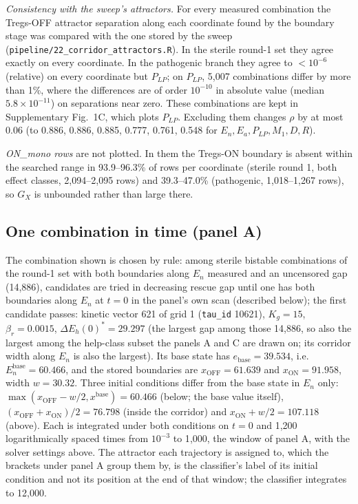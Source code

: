 \documentclass[11pt]{article}
\newcommand{\gap}{\Delta E_h(0)^{*}}
\begin{document}
\emph{Consistency with the sweep's attractors.} For every measured combination the Tregs-OFF
attractor separation along each coordinate found by the boundary stage was compared with the
one stored by the sweep (\texttt{pipeline/22\_corridor\_attractors.R}). In the sterile round-1 set
they agree exactly on every coordinate. In the pathogenic branch they agree to $<10^{-6}$
(relative) on every coordinate but $P_{LP}$; on $P_{LP}$, 5{,}007 combinations differ by more than
1\%, where the differences are of order $10^{-10}$ in absolute value (median
$5.8\times10^{-11}$) on separations near zero. These combinations are kept in Supplementary Fig.~1C, which
plots $P_{LP}$. Excluding them changes $\rho$ by at most 0.06 (to 0.886, 0.886, 0.885, 0.777,
0.761, 0.548 for $E_n, E_a, P_{LP}, M_1, D, R$).

\emph{ON\_mono rows} are not plotted. In them the Tregs-ON boundary is absent within the searched
range in 93.9--96.3\% of rows per coordinate (sterile round 1, both effect classes,
2{,}094--2{,}095 rows) and
39.3--47.0\% (pathogenic, 1{,}018--1{,}267 rows), so $G_X$ is unbounded rather than large there.

\subsection{One combination in time (panel A)}

The combination shown is chosen by rule: among sterile bistable combinations of the round-1 set
with both boundaries along $E_n$ measured and an uncensored gap (14{,}886), candidates are tried
in decreasing rescue gap until one has both boundaries along $E_n$ at $t=0$ in the panel's own
scan (described below); the first candidate passes: kinetic vector 621 of grid 1
(\texttt{tau\_id} 10621), $K_g = 15$, $\beta_r = 0.0015$, $\gap = 29.297$
(the largest gap among those 14{,}886, so also the largest among the help-class subset the
panels A and C are drawn on; its corridor width along $E_n$ is also the largest).
Its base state has $e_{\mathrm{base}} = 39.534$, i.e.\ $E_n^{\mathrm{base}} = 60.466$, and the stored
boundaries are $x_{\mathrm{OFF}} = 61.639$ and $x_{\mathrm{ON}} = 91.958$, width $w = 30.32$. Three initial
conditions differ from the base state in $E_n$ only:
$\max(x_{\mathrm{OFF}} - w/2, x^{\mathrm{base}}) = 60.466$ (below; the base value itself),
$(x_{\mathrm{OFF}}+x_{\mathrm{ON}})/2 = 76.798$ (inside the corridor) and $x_{\mathrm{ON}} + w/2 = 107.118$ (above).
Each is integrated under both conditions on $t=0$ and 1{,}200 logarithmically spaced times from
$10^{-3}$ to 1{,}000, the window of panel A, with the solver settings above. The attractor each
trajectory is assigned to, which the brackets under panel A group them by, is the classifier's
label of its initial condition and not its position at the end of that window; the classifier
integrates to 12{,}000.
\end{document}
